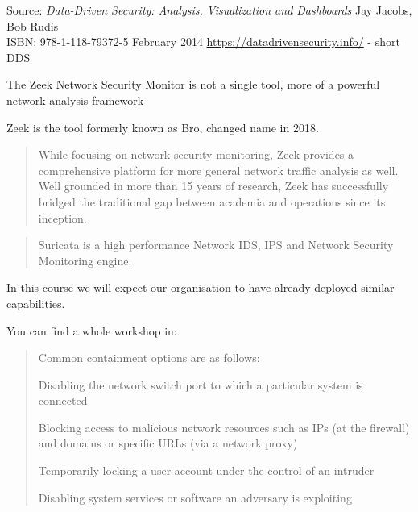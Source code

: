 \documentclass[Screen16to9,17pt]{foils}
\begin{document}
Source: \emph{Data-Driven Security: Analysis, Visualization and Dashboards} Jay Jacobs, Bob Rudis\\
ISBN: 978-1-118-79372-5 February 2014 \url{https://datadrivensecurity.info/} - short DDS



The Zeek Network Security Monitor is not a single tool, more of a
powerful network analysis framework

Zeek is the tool formerly known as Bro, changed name in 2018. 




\begin{quote}
While focusing on network security monitoring, Zeek provides a comprehensive platform for more general network traffic analysis as well. Well grounded in more than 15 years of research, Zeek has successfully bridged the traditional gap between academia and operations since its inception.
\end{quote}




\begin{quote}
Suricata is a high performance Network IDS, IPS and Network Security Monitoring engine.
\end{quote}


In this course we will expect our organisation to have already deployed similar capabilities.

You can find a whole workshop in:\\
{\small{}}





\begin{quote}
Common containment options are as follows:
\begin{list2}
\item Disabling the network switch port to which a particular system is connected
\item  Blocking access to malicious network resources such as IPs (at the firewall) and domains or specific URLs (via a network proxy)
\item  Temporarily locking a user account under the control of an intruder
\item  Disabling system services or software an adversary is exploiting
\end{list2}
\end{quote}
\end{document}
